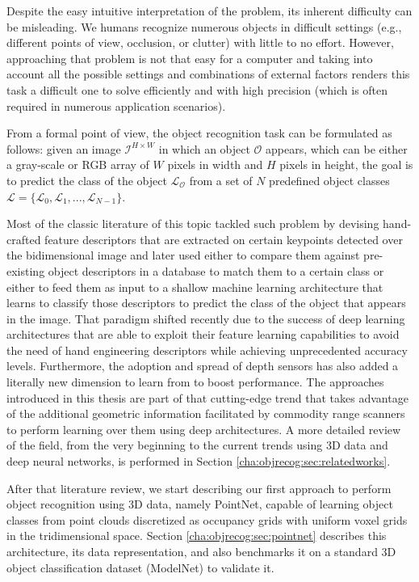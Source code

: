 Despite the easy intuitive interpretation of the problem, its inherent difficulty can be misleading. We humans recognize numerous objects in difficult settings (e.g., different points of view, occlusion, or clutter) with little to no effort. However, approaching that problem is not that easy for a computer and taking into account all the possible settings and combinations of external factors renders this task a difficult one to solve efficiently and with high precision (which is often required in numerous application scenarios).

From a formal point of view, the object recognition task can be formulated as follows: given an image $\mathcal{I}^{H\times W}$ in which an object $\mathcal{O}$ appears, which can be either a gray-scale or RGB array of $W$ pixels in width and $H$ pixels in height, the goal is to predict the class of the object $\mathcal{L_O}$ from a set of $N$ predefined object classes $\mathcal{L} = \{\mathcal{L}_0, \mathcal{L}_1, ..., \mathcal{L}_{N-1}\}$.

Most of the classic literature of this topic tackled such problem by devising hand-crafted feature descriptors that are extracted on certain keypoints detected over the bidimensional image and later used either to compare them against pre-existing object descriptors in a database to match them to a certain class or either to feed them as input to a shallow machine learning architecture that learns to classify those descriptors to predict the class of the object that appears in the image. That paradigm shifted recently due to the success of deep learning architectures that are able to exploit their feature learning capabilities to avoid the need of hand engineering descriptors while achieving unprecedented accuracy levels. Furthermore, the adoption and spread of depth sensors has also added a literally new dimension to learn from to boost performance. The approaches introduced in this thesis are part of that cutting-edge trend that takes advantage of the additional geometric information facilitated by commodity range scanners to perform learning over them using deep architectures. A more detailed review of the field, from the very beginning to the current trends using 3D data and deep neural networks, is performed in Section \ref{cha:objrecog:sec:relatedworks}.

After that literature review, we start describing our first approach to perform object recognition using 3D data, namely PointNet, capable of learning object classes from point clouds discretized as occupancy grids with uniform voxel grids in the tridimensional space. Section \ref{cha:objrecog:sec:pointnet} describes this architecture, its data representation, and also benchmarks it on a standard 3D object classification dataset (ModelNet) to validate it.

